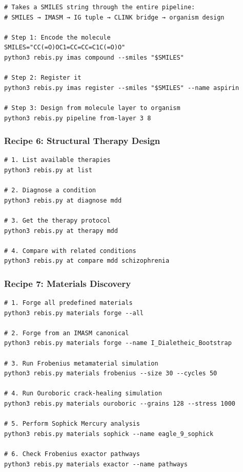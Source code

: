 \begin{verbatim}
# Takes a SMILES string through the entire pipeline:
# SMILES → IMASM → IG tuple → CLINK bridge → organism design

# Step 1: Encode the molecule
SMILES="CC(=O)OC1=CC=CC=C1C(=O)O"
python3 rebis.py imas compound --smiles "$SMILES"

# Step 2: Register it
python3 rebis.py imas register --smiles "$SMILES" --name aspirin

# Step 3: Design from molecule layer to organism
python3 rebis.py pipeline from-layer 3 8
\end{verbatim}

\hypertarget{recipe-6-structural-therapy-design}{%
\subsubsection{Recipe 6: Structural Therapy
Design}\label{recipe-6-structural-therapy-design}}

\begin{verbatim}
# 1. List available therapies
python3 rebis.py at list

# 2. Diagnose a condition
python3 rebis.py at diagnose mdd

# 3. Get the therapy protocol
python3 rebis.py at therapy mdd

# 4. Compare with related conditions
python3 rebis.py at compare mdd schizophrenia
\end{verbatim}

\hypertarget{recipe-7-materials-discovery}{%
\subsubsection{Recipe 7: Materials
Discovery}\label{recipe-7-materials-discovery}}

\begin{verbatim}
# 1. Forge all predefined materials
python3 rebis.py materials forge --all

# 2. Forge from an IMASM canonical
python3 rebis.py materials forge --name I_Dialetheic_Bootstrap

# 3. Run Frobenius metamaterial simulation
python3 rebis.py materials frobenius --size 30 --cycles 50

# 4. Run Ouroboric crack-healing simulation
python3 rebis.py materials ouroboric --grains 128 --stress 1000

# 5. Perform Sophick Mercury analysis
python3 rebis.py materials sophick --name eagle_9_sophick

# 6. Check Frobenius exactor pathways
python3 rebis.py materials exactor --name pathways
\end{verbatim}

